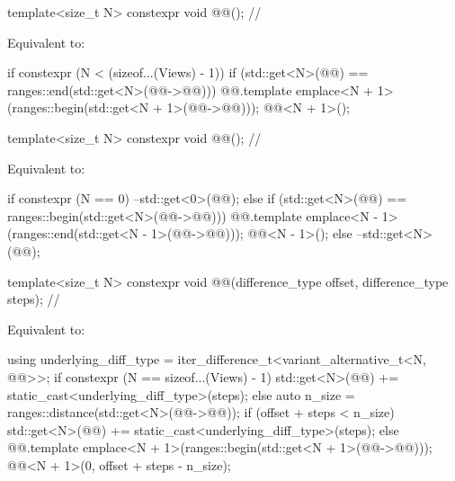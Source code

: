 %
\begin{itemdecl}
template<size_t N>
  constexpr void @@();                                 // \expos
\end{itemdecl}

\begin{itemdescr}
\pnum
\effects
Equivalent to:
\begin{codeblock}
if constexpr (N < (sizeof...(Views) - 1)) {
  if (std::get<N>(@@) == ranges::end(std::get<N>(@@->@@))) {
    @@.template emplace<N + 1>(ranges::begin(std::get<N + 1>(@@->@@)));
    @@<N + 1>();
  }
}
\end{codeblock}
\end{itemdescr}

%
\begin{itemdecl}
template<size_t N>
  constexpr void @@();                                    // \expos
\end{itemdecl}

\begin{itemdescr}
\pnum
\effects
Equivalent to:
\begin{codeblock}
if constexpr (N == 0) {
  --std::get<0>(@@);
} else {
  if (std::get<N>(@@) == ranges::begin(std::get<N>(@@->@@))) {
    @@.template emplace<N - 1>(ranges::end(std::get<N - 1>(@@->@@)));
    @@<N - 1>();
  } else {
    --std::get<N>(@@);
  }
}
\end{codeblock}
\end{itemdescr}

%
\begin{itemdecl}
template<size_t N>
  constexpr void @@(difference_type offset, difference_type steps);        // \expos
\end{itemdecl}

\begin{itemdescr}
\pnum
\effects
Equivalent to:
\begin{codeblock}
using underlying_diff_type = iter_difference_t<variant_alternative_t<N, @@>>;
if constexpr (N == sizeof...(Views) - 1) {
  std::get<N>(@@) += static_cast<underlying_diff_type>(steps);
} else {
  auto n_size = ranges::distance(std::get<N>(@@->@@));
  if (offset + steps < n_size) {
    std::get<N>(@@) += static_cast<underlying_diff_type>(steps);
  } else {
    @@.template emplace<N + 1>(ranges::begin(std::get<N + 1>(@@->@@)));
    @@<N + 1>(0, offset + steps - n_size);
  }
}
\end{codeblock}
\end{itemdescr}

